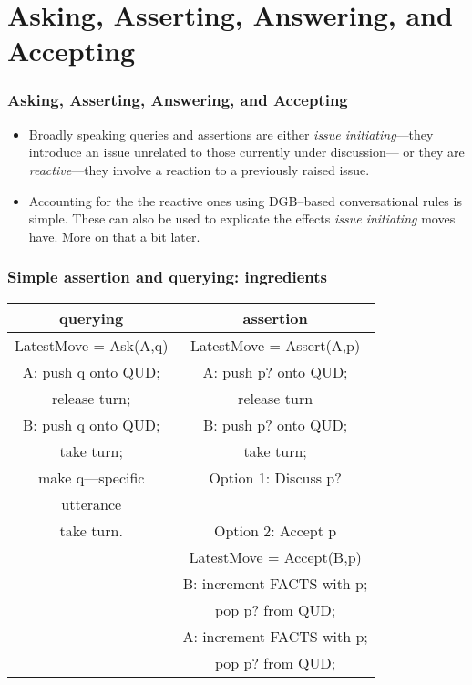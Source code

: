 \documentclass{beamer}
\newcommand{\bit}{\begin{itemize}}
\newcommand{\eit}{\end{itemize}}
\begin{document}
\section{Asking, Asserting, Answering, and Accepting}

\begin{frame}\frametitle{Asking, Asserting, Answering, and Accepting}

\bit

\item Broadly speaking queries and assertions are either \emph{issue
initiating}---they introduce an issue unrelated to those currently
under discussion--- or they are \emph{reactive}---they involve a
reaction to a previously raised issue.

\item Accounting for the the reactive ones using
DGB--based conversational rules is simple. These can also be used to
explicate the effects \emph{issue initiating} moves have. More on that a bit later.
\eit\end{frame}


\begin{frame}\frametitle{Simple assertion and querying: ingredients}

{\small
\begin{tabular}{|c|c|}
  \hline
  {\sf  querying  } & {\sf  assertion }\\ \hline
  \hline
  LatestMove =  Ask(A,q) & LatestMove =  Assert(A,p)\\ \hline
A: push q onto QUD; &  A:  push p? onto QUD;\\
release turn; & release turn \\ \hline
B: push  q onto QUD; &  B: push p? onto QUD;\\
 take turn; &  take turn;\\
make q---specific &  Option 1: Discuss p?  \\
utterance & \\
 take turn.& Option 2: Accept p\\ \hline
& LatestMove =  Accept(B,p)\\ \hline

& B: increment FACTS with p;\\
& pop p? from QUD;\\ \hline
& A: increment FACTS with p;\\
& pop p? from QUD;\\ \hline
\end{tabular}
}
\end{frame}
\end{document}
